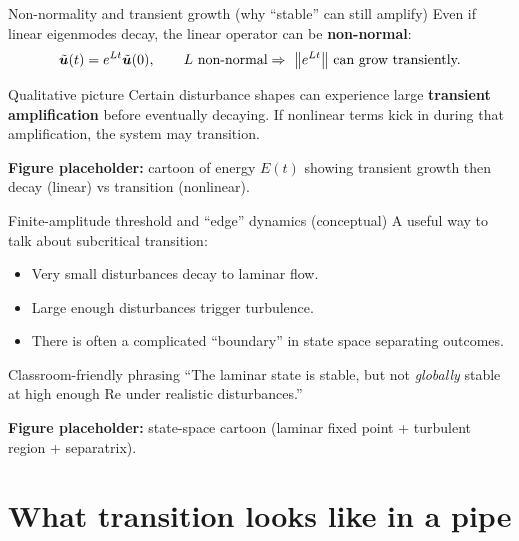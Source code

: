 \documentclass[aspectratio=169]{beamer}
\newcommand{\uu}{\bm{u}}
\newcommand{\Rey}{\mathrm{Re}}
\begin{document}
\begin{frame}{Non-normality and transient growth (why ``stable'' can still amplify)}
Even if linear eigenmodes decay, the linear operator can be \textbf{non-normal}:
\[
\tilde{\uu}(t) = e^{Lt}\tilde{\uu}(0),
\qquad L \ \text{non-normal} \Rightarrow \ \norm{e^{Lt}} \text{ can grow transiently.}
\]

\begin{block}{Qualitative picture}
Certain disturbance shapes can experience large \textbf{transient amplification} before eventually decaying.
If nonlinear terms kick in during that amplification, the system may transition.
\end{block}

\textbf{Figure placeholder:} cartoon of energy $E(t)$ showing transient growth then decay (linear) vs transition (nonlinear).
\end{frame}

\begin{frame}{Finite-amplitude threshold and ``edge'' dynamics (conceptual)}
A useful way to talk about subcritical transition:

\begin{itemize}
  \item Very small disturbances decay to laminar flow.
  \item Large enough disturbances trigger turbulence.
  \item There is often a complicated ``boundary'' in state space separating outcomes.
\end{itemize}

\begin{block}{Classroom-friendly phrasing}
``The laminar state is stable, but not \emph{globally} stable at high enough $\Rey$ under realistic disturbances.''
\end{block}

\textbf{Figure placeholder:} state-space cartoon (laminar fixed point + turbulent region + separatrix).
\end{frame}

\section{What transition looks like in a pipe}
\end{document}
